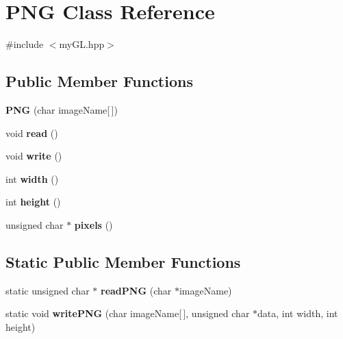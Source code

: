 \hypertarget{classPNG}{}\section{P\+NG Class Reference}
\label{classPNG}


{\ttfamily \#include $<$my\+G\+L.\+hpp$>$}

\subsection*{Public Member Functions}
\begin{DoxyCompactItemize}
\item 
{\bfseries P\+NG} (char image\+Name\mbox{[}$\,$\mbox{]})\hypertarget{classPNG_a8239ef58cce7dfa23bf02a7620e985f5}{}\label{classPNG_a8239ef58cce7dfa23bf02a7620e985f5}

\item 
void {\bfseries read} ()\hypertarget{classPNG_a48b56be2d085e01f01b140528f999f5b}{}\label{classPNG_a48b56be2d085e01f01b140528f999f5b}

\item 
void {\bfseries write} ()\hypertarget{classPNG_a3e0b622c7ab188c3024295f8eebedd04}{}\label{classPNG_a3e0b622c7ab188c3024295f8eebedd04}

\item 
int {\bfseries width} ()\hypertarget{classPNG_a2b1a554b4f86d1b8ffa07c298782b14d}{}\label{classPNG_a2b1a554b4f86d1b8ffa07c298782b14d}

\item 
int {\bfseries height} ()\hypertarget{classPNG_ad6f6685a921c0f26352e22dc144fdda6}{}\label{classPNG_ad6f6685a921c0f26352e22dc144fdda6}

\item 
unsigned char $\ast$ {\bfseries pixels} ()\hypertarget{classPNG_a07898bac65710ae8aaeea6048dc773bc}{}\label{classPNG_a07898bac65710ae8aaeea6048dc773bc}

\end{DoxyCompactItemize}
\subsection*{Static Public Member Functions}
\begin{DoxyCompactItemize}
\item 
static unsigned char $\ast$ {\bfseries read\+P\+NG} (char $\ast$image\+Name)\hypertarget{classPNG_a6df04a0372aa1054cc85a219829d882a}{}\label{classPNG_a6df04a0372aa1054cc85a219829d882a}

\item 
static void {\bfseries write\+P\+NG} (char image\+Name\mbox{[}$\,$\mbox{]}, unsigned char $\ast$data, int width, int height)\hypertarget{classPNG_a12fe7f480b617e0cd58bd0ca7a65ed3a}{}\label{classPNG_a12fe7f480b617e0cd58bd0ca7a65ed3a}

\end{DoxyCompactItemize}
